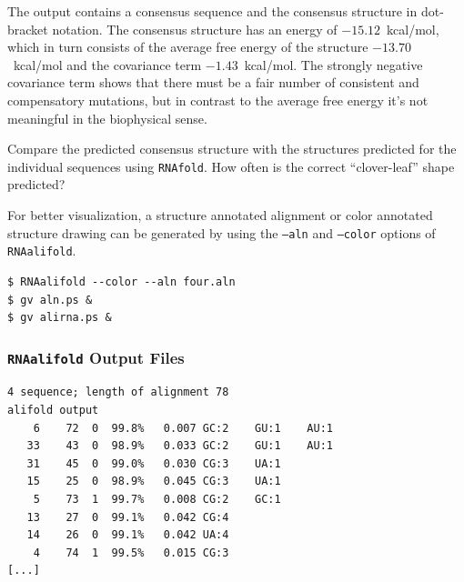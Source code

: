 \documentclass[a4paper]{article}
\newcommand{\frametitle}[1]{\subsubsection{#1}}
\begin{document}
\noindent
The output contains a consensus sequence and the consensus structure
in dot-bracket notation. The consensus structure has an energy of
$-15.12$~kcal/mol, which in turn consists of the average free energy of the
structure $-13.70$~kcal/mol and the covariance term $-1.43$~kcal/mol. The
strongly negative covariance term shows that there must be a fair number of
consistent and compensatory mutations, but in contrast to the average free
energy it's not meaningful in the biophysical sense.

Compare the predicted consensus structure with the structures predicted for
the individual sequences using \texttt{RNAfold}. How often is the correct
``clover-leaf'' shape predicted?

For better visualization, a structure annotated alignment or color annotated structure drawing can be
generated by using the \texttt{--aln} and \texttt{--color} options of \texttt{RNAalifold}.
\begin{verbatim}
$ RNAalifold --color --aln four.aln
$ gv aln.ps &
$ gv alirna.ps &
\end{verbatim}%
  \frametitle{\texttt{RNAalifold} Output Files}
  \begin{center}
\begin{scriptsize}
\begin{verbatim}
4 sequence; length of alignment 78
alifold output
    6    72  0  99.8%   0.007 GC:2    GU:1    AU:1   
   33    43  0  98.9%   0.033 GC:2    GU:1    AU:1   
   31    45  0  99.0%   0.030 CG:3    UA:1   
   15    25  0  98.9%   0.045 CG:3    UA:1   
    5    73  1  99.7%   0.008 CG:2    GC:1   
   13    27  0  99.1%   0.042 CG:4   
   14    26  0  99.1%   0.042 UA:4   
    4    74  1  99.5%   0.015 CG:3   
[...]
\end{verbatim}
\end{scriptsize}
\end{center}

\end{document}
